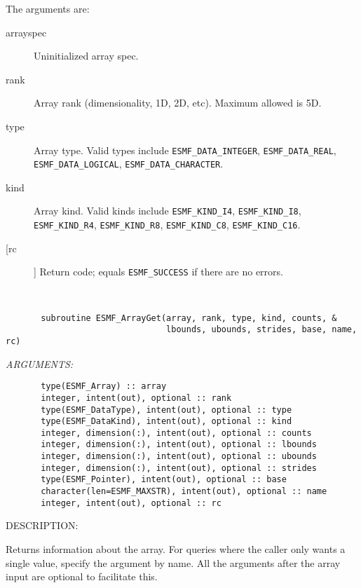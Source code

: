    The arguments are:
   \begin{description}
  
   \item[arrayspec]
   Uninitialized array spec.
  
   \item[rank]
   Array rank (dimensionality, 1D, 2D, etc). Maximum allowed is 5D.
  
   \item[type]
   Array type. Valid types include {\tt ESMF\_DATA\_INTEGER},
   {\tt ESMF\_DATA\_REAL}, {\tt ESMF\_DATA\_LOGICAL},
   {\tt ESMF\_DATA\_CHARACTER}.
  
   \item[kind]
   Array kind. Valid kinds include {\tt ESMF\_KIND\_I4},
   {\tt ESMF\_KIND\_I8}, {\tt ESMF\_KIND\_R4}, {\tt ESMF\_KIND\_R8},
   {\tt ESMF\_KIND\_C8}, {\tt ESMF\_KIND\_C16}.
  
   \item[[rc]]
   Return code; equals {\tt ESMF\_SUCCESS} if there are no errors.
  
   \end{description}
   
 
\mbox{}\hrulefill\ 
 

\begin{verbatim}       subroutine ESMF_ArrayGet(array, rank, type, kind, counts, &
                                lbounds, ubounds, strides, base, name, rc)\end{verbatim}{\em ARGUMENTS:}
\begin{verbatim}       type(ESMF_Array) :: array
       integer, intent(out), optional :: rank
       type(ESMF_DataType), intent(out), optional :: type
       type(ESMF_DataKind), intent(out), optional :: kind
       integer, dimension(:), intent(out), optional :: counts
       integer, dimension(:), intent(out), optional :: lbounds
       integer, dimension(:), intent(out), optional :: ubounds
       integer, dimension(:), intent(out), optional :: strides
       type(ESMF_Pointer), intent(out), optional :: base
       character(len=ESMF_MAXSTR), intent(out), optional :: name
       integer, intent(out), optional :: rc\end{verbatim}
{\sf DESCRIPTION:\\ }


   Returns information about the array. For queries where the caller
   only wants a single value, specify the argument by name.
   All the arguments after the array input are optional to facilitate this.
   
